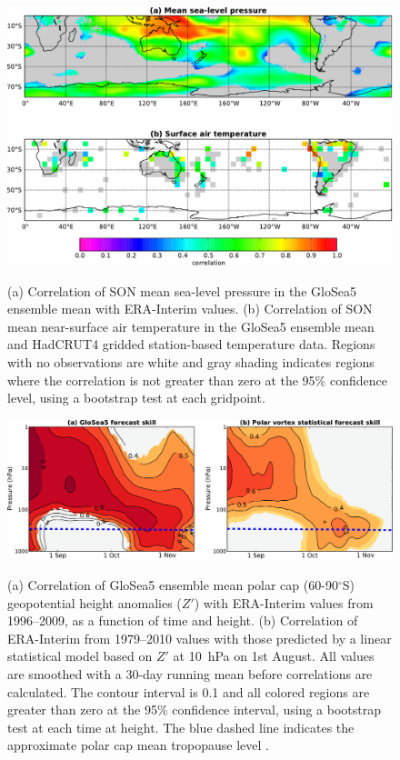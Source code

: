 \begin{figure}[t]
  \noindent\includegraphics[width=\textwidth,angle=0]{figures/GloSea5/mslp_tsrf_maps_crop.pdf}\\
  \caption[Correlation of GloSea5 forecasts of sea-level pressure and temperature.]{(a) Correlation of SON mean sea-level pressure in the GloSea5 ensemble mean with ERA-Interim values. (b) Correlation of SON mean near-surface air temperature in the GloSea5 ensemble mean and HadCRUT4 gridded station-based temperature data. Regions with no observations are white and gray shading indicates regions where the correlation is not greater than zero at the 95\% confidence level, using a bootstrap test at each gridpoint.}\label{Fig6}
\end{figure}

\begin{figure}[t]
  \noindent\includegraphics[width=\textwidth,angle=0]{figures/GloSea5/lag_corr_crop.pdf}\\
  \caption[Lag-height correlation of GloSea5 polar cap geopotential height]{(a) Correlation of GloSea5 ensemble mean polar cap (60-90$^{\circ}$S) geopotential height anomalies ($Z'$) with ERA-Interim values from 1996--2009, as a function of time and height. (b) Correlation of ERA-Interim from 1979--2010 values with those predicted by a linear statistical model based on $Z'$ at 10~hPa on 1st August. All values are smoothed with a 30-day running mean before correlations are calculated. The contour interval is 0.1 and all colored regions are greater than zero at the 95\% confidence interval, using a bootstrap test at each time at height. The blue dashed line indicates the approximate polar cap mean tropopause level \citep{Wilcox2012}.}\label{Fig7}
\end{figure}

